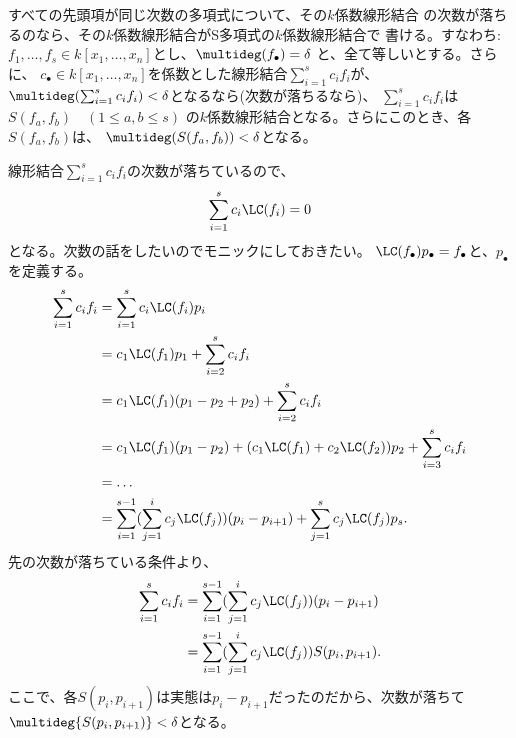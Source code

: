 すべての先頭項が同じ次数の多項式について、その$k$係数線形結合
の次数が落ちるのなら、その$k$係数線形結合がS多項式の$k$係数線形結合で
書ける。すなわち:
$f_1,\dots,f_s \in k[x_1,\dots,x_n]$とし、$\multideg(f_\bullet ) = \delta$
と、全て等しいとする。さらに、
$c_\bullet \in k[x_1,\dots,x_n]$を係数とした線形結合$\sum_{i=1}^s c_i f_i$が、
$\multideg(\sum_{i=1}^s c_i f_i) < \delta$となるなら(次数が落ちるなら)、
$\sum_{i=1}^s c_i f_i$は$S(f_a,f_b)\quad (1 \le a,b \le s)$
の$k$係数線形結合となる。さらにこのとき、各$S(f_a,f_b)$は、
$\multideg(S(f_a,f_b))<\delta$となる。
\begin{myproof}
  線形結合$\sum_{i=1}^s c_i f_i$の次数が落ちているので、
  \begin{align}
    \sum_{i=1}^s c_i \LC(f_i) = 0
  \end{align}
  となる。次数の話をしたいのでモニックにしておきたい。
  $\LC(f_\bullet)p_\bullet = f_\bullet$と、$p_\bullet$を定義する。
  \begin{align}
    \sum_{i=1}^s c_i f_i
    &=
    \sum_{i=1}^s c_i \LC(f_i)p_i\\
    &=
    c_1 \LC(f_1) p_1 + \sum_{i=2}^s c_i f_i \\
    &=
    c_1 \LC(f_1) (p_1 - p_2 + p_2) + \sum_{i=2}^s c_i f_i \\
    &=
    c_1 \LC(f_1) (p_1 - p_2)
    + (c_1 \LC(f_1) + c_2 \LC(f_2))p_2
    + \sum_{i=3}^s c_i f_i\\
    &=\dots\\
    &=
    \sum_{i=1}^{s-1} (\sum_{j=1}^i c_j \LC(f_j))(p_i - p_{i+1})
    + \sum_{j=1}^s c_j \LC(f_j)p_s.
  \end{align}
  先の次数が落ちている条件より、
  \begin{align}
    \sum_{i=1}^s c_i f_i
    &=
    \sum_{i=1}^{s-1}(\sum_{j=1}^i c_j \LC(f_j))(p_i - p_{i+1})\\
    &=
    \sum_{i=1}^{s-1}(\sum_{j=1}^i c_j \LC(f_j))S(p_i,p_{i+1}).
  \end{align}
ここで、各$S(p_i,p_{i+1})$は実態は$p_i-p_{i+1}$だったのだから、次数が落ちて
$\multideg{S(p_i,p_{i+1})}<\delta$となる。
\end{myproof}

